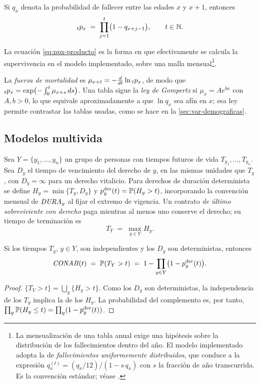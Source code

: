 \begin{corollary}
\label{cor:discreta}
Si $q_{x}$ denota la probabilidad de fallecer entre las edades $x$ y $x+1$,
entonces
\begin{equation}
\label{eq:npx-producto}
  {}_{t}p_{x} \;=\; \prod_{j=1}^{t}\bigl(1-q_{x+j-1}\bigr),\qquad t\in\mathbb{N}.
\end{equation}
\end{corollary}

La ecuación \cref{eq:npx-producto} es la forma en que efectivamente se calcula la
supervivencia en el modelo implementado, sobre una malla mensual\footnote{La mensualización de una tabla anual exige una hipótesis sobre la distribución de los fallecimientos dentro del año. El modelo implementado adopta la de \emph{fallecimientos uniformemente distribuidos}, que conduce a la expresión $q^{(t)}_{x}=(q_x/12)/(1-s\,q_x)$ con $s$ la fracción de año transcurrida. Es la convención estándar; véase \citet[cap.~3]{dickson2020}.}.

La \emph{fuerza de mortalidad} es $\mu_{x+t}=-\frac{d}{dt}\ln{}_{t}p_{x}$, de modo que
${}_{t}p_{x}=\exp\bigl(-\int_0^t\mu_{x+s}\,ds\bigr)$. Una tabla sigue la \emph{ley de
Gompertz} si $\mu_x=Ae^{bx}$ con $A,b>0$, lo que equivale aproximadamente a que
$\ln q_x$ sea afín en $x$; esa ley permite contrastar las tablas usadas, como se hace
en la \cref{sec:var-demograficas}.

\subsection{Modelos multivida}

Sea $Y=\{y_1,\dots,y_n\}$ un grupo de personas con tiempos futuros de vida
$T_{y_1},\dots,T_{y_n}$. Sea $D_y$ el tiempo de vencimiento del derecho de $y$,
en las mismas unidades que $T_y$, con $D_y=\infty$ para un derecho vitalicio.
Para derechos de duración determinista se define $H_y=\min\{T_y,D_y\}$ y
$p_y^{\mathrm{der}}(t)=\mathbb{P}(H_y>t)$, incorporando la convención mensual de
$\mathit{DURA}_y$ al fijar el extremo de vigencia. Un contrato \emph{de último
sobreviviente con derecho} paga mientras al menos uno conserve el derecho;
su tiempo de terminación es
\[
  T_Y \;=\; \max_{y\in Y} H_y.
\]

\begin{proposition}
\label{prop:conab}
Si los tiempos $T_y$, $y\in Y$, son independientes y los $D_y$ son
deterministas, entonces
\begin{equation}
\label{eq:conab}
  \mathit{CONAB}(t)\;=\;\mathbb{P}(T_Y>t)\;=\;1-\prod_{y\in Y}\bigl(1-p_y^{\mathrm{der}}(t)\bigr).
\end{equation}
\end{proposition}
\begin{proof}
$\{T_Y>t\}=\bigcup_y\{H_y>t\}$. Como los $D_y$ son deterministas, la
independencia de los $T_y$ implica la de los $H_y$. La probabilidad del
complemento es, por tanto, $\prod_y\mathbb{P}(H_y\le t)
=\prod_y(1-p_y^{\mathrm{der}}(t))$.
\end{proof}

